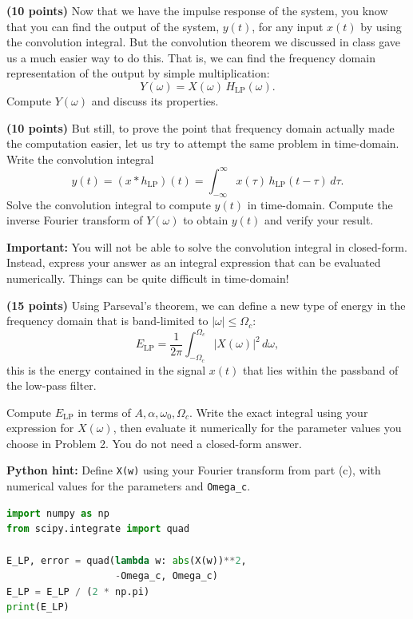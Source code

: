 \documentclass{ee102_pset}
\begin{document}
\problempart \textbf{(10 points)}
Now that we have the impulse response of the system, you know that you can find the output of the system, \(y(t)\), for any input \(x(t)\) by using the convolution integral. But the convolution theorem we discussed in class gave us a much easier way to do this. That is, we can find the frequency domain representation of the output by simple multiplication:
\[
Y(\omega)=X(\omega)\,H_{\mathrm{LP}}(\omega).
\]
Compute \(Y(\omega)\) and discuss its properties.

\problempart \textbf{(10 points)}
But still, to prove the point that frequency domain actually made the computation easier, let us try to attempt the same problem in time-domain. Write the convolution integral
\[
y(t)=(x*h_{\mathrm{LP}})(t)=\int_{-\infty}^{\infty} x(\tau)\,h_{\mathrm{LP}}(t-\tau)\,d\tau.
\]
Solve the convolution integral to compute $y(t)$ in time-domain.
Compute the inverse Fourier transform of \(Y(\omega)\) to obtain \(y(t)\) and verify your result. 

\textbf{\color{blue}Important:} You will not be able to solve the convolution integral in closed-form. Instead, express your answer as an integral expression that can be evaluated numerically. Things can be quite difficult in time-domain!

\problempart \textbf{(15 points)}
Using Parseval's theorem, we can define a new type of energy in the frequency domain that is band-limited to \(|\omega|\le \Omega_c\):
\[
E_{\mathrm{LP}}=\frac{1}{2\pi}\int_{-\Omega_c}^{\Omega_c} |X(\omega)|^2\,d\omega,
\]
this is the energy contained in the signal \(x(t)\) that lies within the passband of the low-pass filter.

Compute \(E_{\mathrm{LP}}\) in terms of \(A,\alpha,\omega_0,\Omega_c\).
Write the exact integral using your expression for \(X(\omega)\), then evaluate it numerically for the parameter values you choose in Problem 2. You do not need a closed-form answer.

\noindent\begin{minipage}{\linewidth}
\textbf{Python hint:} Define \texttt{X(w)} using your Fourier transform from part (c), with numerical values for the parameters and \texttt{Omega\_c}.
\begin{lstlisting}[language=Python,basicstyle=\ttfamily\small,frame=single,breaklines=true,columns=fullflexible]
import numpy as np
from scipy.integrate import quad

E_LP, error = quad(lambda w: abs(X(w))**2,
                   -Omega_c, Omega_c)
E_LP = E_LP / (2 * np.pi)
print(E_LP)
\end{lstlisting}
\end{minipage}
\end{document}
